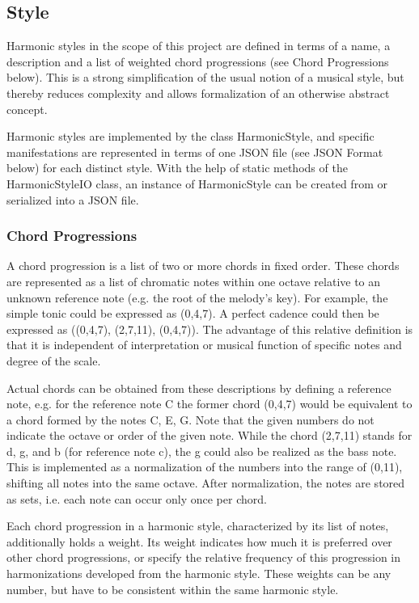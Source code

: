 
\subsection{Style}
Harmonic styles in the scope of this project are defined in terms of a name, a description and a list of weighted chord progressions (see Chord Progressions below). This is a strong simplification of the usual notion of a musical style, but thereby reduces complexity and allows formalization of an otherwise abstract concept.

Harmonic styles are implemented by the class HarmonicStyle, and specific manifestations are represented in terms of one JSON file (see JSON Format below) for each distinct style. With the help of static methods of the HarmonicStyleIO class, an instance of HarmonicStyle can be created from or serialized into a JSON file.

\subsubsection{Chord Progressions}
A chord progression is a list of two or more chords in fixed order. These chords are represented as a list of chromatic notes within one octave relative to an unknown reference note (e.g. the root of the melody's key). For example, the simple tonic could be expressed as (0,4,7). A perfect cadence could then be expressed as ((0,4,7), (2,7,11), (0,4,7)). The advantage of this relative definition is that it is independent of interpretation or musical function of specific notes and degree of the scale.

Actual chords can be obtained from these descriptions by defining a reference note, e.g. for the reference note C the former chord (0,4,7) would be equivalent to a chord formed by the notes C, E, G. Note that the given numbers do not indicate the octave or order of the given note. While the chord (2,7,11) stands for d, g, and b (for reference note c), the g could also be realized as the bass note. This is implemented as a normalization of the numbers into the range of (0,11), shifting all notes into the same octave. After normalization, the notes are stored as sets, i.e. each note can occur only once per chord.

Each chord progression in a harmonic style, characterized by its list of notes, additionally holds a weight. Its weight indicates how much it is preferred over other chord progressions, or specify the relative frequency of this progression in harmonizations developed from the harmonic style. These weights can be any number, but have to be consistent within the same harmonic style.

